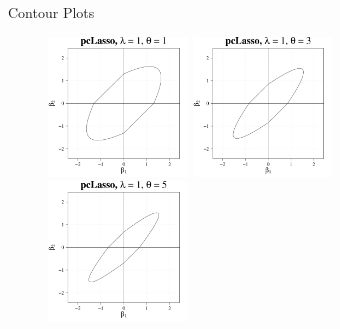 \documentclass[8pt]{beamer}
\begin{document}
\begin{frame}{Contour Plots}

\begin{figure}
    \centering
    \includegraphics[width = 0.33\textwidth]{Presentation/cont_pcLasso_t3.pdf}
    \includegraphics[width = 0.33\textwidth]{Presentation/cont_pcLasso_t2.pdf}
    \includegraphics[width = 0.33\textwidth]{Presentation/cont_pcLasso_t1.pdf}
    

\end{figure}
\end{frame}
\end{document}
